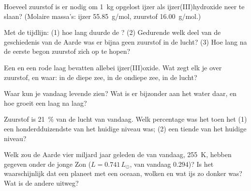\begin{exercise}[$\star\star$]\label{exo:g12:early-earth:7}
Hoeveel zuurstof is er nodig om \qty{1}{kg} opgelost ijzer als
ijzer(III)hydroxide neer te slaan? (Molaire massa's: ijzer \qty{55.85}{g/mol}, zuurstof
\qty{16.00}{g/mol}.)
\end{exercise}

\begin{exercise}[$\star\star$]\label{exo:g12:early-earth:8}
Met de tijdlijn: (1) hoe lang duurde de ? (2)
Gedurende welk deel van de geschiedenis van de Aarde was er bijna geen zuurstof in de
lucht? (3) Hoe lang na de eerste  begon zuurstof zich op te hopen?
\end{exercise}

\begin{exercise}[$\star\star$]\label{exo:g12:early-earth:9}
Een  en een rode laag bevatten allebei ijzer(III)oxide. Wat
zegt elk je over zuurstof, en waar: in de diepe zee, in de ondiepe
zee, in de lucht?
\end{exercise}

\begin{exercise}[$\star\star$]\label{exo:g12:early-earth:10}
Waar kun je vandaag levende  zien? Wat is er bijzonder aan het
water daar, en hoe groeit een  laag na laag?
\end{exercise}

\begin{exercise}[$\star\star$]\label{exo:g12:early-earth:11}
Zuurstof is \qty{21}{\percent} van de lucht van vandaag. Welk percentage was het toen het
(1) een honderdduizendste van het huidige niveau was; (2) een tiende van het huidige niveau?
\end{exercise}

\begin{exercise}[$\star\star\star$]\label{exo:g12:early-earth:12}
Welk  zou de Aarde vier miljard jaar geleden de  van vandaag,
\qty{255}{K}, hebben gegeven onder de jonge Zon ($L = 0.741\,L_\odot$,
 van vandaag 0.294)? Is het waarschijnlijk dat een planeet met een oceaan, wolken en wat ijs
zo donker was? Wat is de andere uitweg?
\end{exercise}

